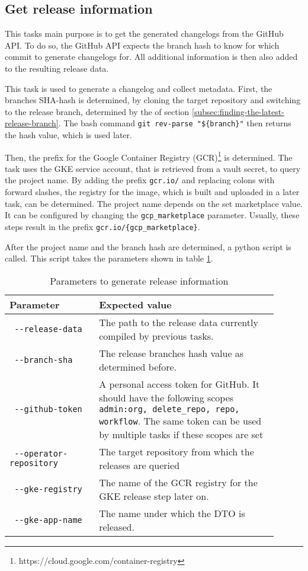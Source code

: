 \subsection{Get release information}\label{subsec:get-release-information}

This tasks main purpose is to get the generated changelogs from the GitHub API.
To do so, the GitHub API expects the branch hash to know for which commit to generate changelogs for.
All additional information is then also added to the resulting release data.

This task is used to generate a changelog and collect metadata.
First, the branches SHA-hash is determined, by cloning the target repository and switching to the release branch, determined by the of section \ref{subsec:finding-the-latest-release-branch}.
The bash command \verb|git rev-parse "${branch}"| then returns the hash value, which is used later.

Then, the prefix for the Google Container Registry (GCR)\footnote{https://cloud.google.com/container-registry} is determined.
The task uses the GKE service account, that is retrieved from a vault secret, to query the project name.
By adding the prefix \verb|gcr.io/| and replacing colons with forward slashes, the registry for the image, which is built and uploaded in a later task, can be determined.
The project name depends on the set marketplace value.
It can be configured by changing the \verb|gcp_marketplace| parameter.
Usually, these steps result in the prefix \verb|gcr.io/{gcp_marketplace}|.

After the project name and the branch hash are determined, a python script is called.
This script takes the parameters shown in table \ref{tab:params-to-generate-release-information}.

\begin{table}[h]
    \centering
    \caption{Parameters to generate release information}
    \label{tab:params-to-generate-release-information}
    \begin{tabular}{p{0.3\linewidth}|p{0.6\linewidth}}
        Parameter & Expected value \\
        \hline
        \verb| --release-data | & The path to the release data currently compiled by previous tasks.  \\
        \verb| --branch-sha | & The release branches hash value as determined before. \\
        \verb| --github-token | & A personal access token for GitHub. It should have the following scopes \verb|admin:org, delete_repo, repo, workflow|. The same token can be used by multiple tasks if these scopes are set \\
        \verb| --operator-repository | & The target repository from which the releases are queried \\
        \verb| --gke-registry | & The name of the GCR registry for the GKE release step later on. \\
        \verb| --gke-app-name | & The name under which the DTO is released. \\
    \end{tabular}
\end{table}

